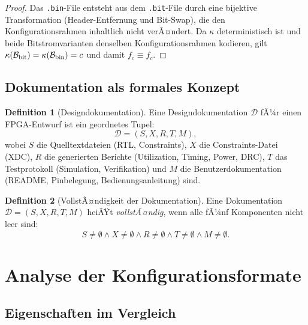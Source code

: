 ﻿\documentclass[a4paper,12pt]{article}
\theoremstyle{definition}
\newtheorem{definition}{Definition}
\begin{document}
\begin{proof}
    Das \texttt{.bin}-File entsteht aus dem \texttt{.bit}-File durch eine
    bijektive Transformation (Header-Entfernung und Bit-Swap), die den
    Konfigurationsrahmen inhaltlich nicht verÃ¤ndert. Da $\kappa$ deterministisch
    ist und beide Bitstromvarianten denselben Konfigurationsrahmen kodieren,
    gilt $\kappa(\mathcal{B}_{\rm bit}) = \kappa(\mathcal{B}_{\rm bin}) = c$
    und damit $f_c \equiv f_c$. \qedhere
\end{proof}

\subsection{Dokumentation als formales Konzept}

\begin{definition}[Designdokumentation]
    Eine Designdokumentation $\mathcal{D}$ fÃ¼r einen FPGA-Entwurf ist ein
    geordnetes Tupel:
    \[
    \mathcal{D} = (S, X, R, T, M),
    \]
    wobei
    $S$ die Quelltextdateien (RTL, Constraints),
    $X$ die Constraints-Datei (XDC),
    $R$ die generierten Berichte (Utilization, Timing, Power, DRC),
    $T$ das Testprotokoll (Simulation, Verifikation) und
    $M$ die Benutzerdokumentation (README, Pinbelegung, Bedienungsanleitung)
    sind.
\end{definition}

\begin{definition}[VollstÃ¤ndigkeit der Dokumentation]
    Eine Dokumentation $\mathcal{D} = (S, X, R, T, M)$ heiÃŸt
    \emph{vollstÃ¤ndig}, wenn alle fÃ¼nf Komponenten nicht leer sind:
    \[
    S \neq \emptyset \wedge X \neq \emptyset \wedge R \neq \emptyset
    \wedge T \neq \emptyset \wedge M \neq \emptyset.
    \]
\end{definition}

\section{Analyse der Konfigurationsformate}
\label{sec:bitbin}

\subsection{Eigenschaften im Vergleich}
\end{document}
